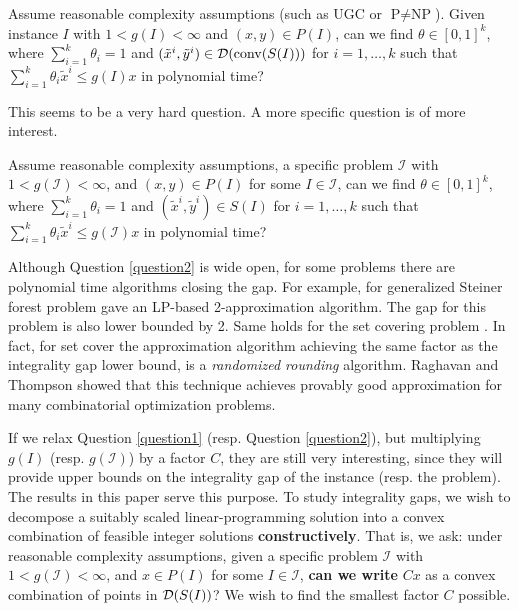 \begin{question*}\label{question1}
	Assume reasonable complexity assumptions (such as UGC or $\textrm{P}\neq \textrm{NP}$). Given instance $I$ with $1<g(I)<\infty$ and $(x,y)\in P(I)$, can we find $\theta \in [0,1]^k$, where $\sum_{i=1}^{k}\theta_i =1$ and $(\tilde{x}^i,\tilde{y}^i)\in \operatorname{\mathcal{D}}(\operatorname{conv}(S(I)))$ for $i=1,\ldots,k$ such that $\sum_{i=1}^{k}\theta_i \tilde{x}^i\leq g(I)x$ in polynomial time?
\end{question*}

This seems to be a very hard question. A more specific question is of more interest.

\begin{question}\label{question2}
	Assume reasonable complexity assumptions, a specific problem $\mathcal{I}$ with  $1<g({\mathcal{I}})<\infty$, and $(x,y)\in P(I)$ for some $I\in \mathcal{I}$, can we find $\theta \in [0,1]^k$, where $\sum_{i=1}^{k}\theta_i =1$ and $(\tilde{x}^i,\tilde{y}^i)\in S(I)$ for $i=1,\ldots,k$ such that $\sum_{i=1}^{k}\theta_i \tilde{x}^i\leq g(\mathcal{I})x$ in polynomial time?
\end{question}
Although Question \ref{question2} is wide open, for some problems there are polynomial time algorithms closing the gap. For example, for generalized Steiner forest problem \cite{jain} gave an LP-based 2-approximation algorithm. The gap for this problem is also lower bounded by 2. Same holds for the set covering problem \cite{randomizedrounding}. In fact, for set cover the approximation algorithm achieving the same factor as the integrality gap lower bound, is a \textit{randomized rounding} algorithm. Raghavan and Thompson \cite{randomizedrounding} showed that this technique achieves provably good approximation for many combinatorial optimization problems.  

If we relax Question \ref{question1} (resp. Question \ref{question2}), but multiplying $g(I)$ (resp. $g(\mathcal{I})$) by a factor $C$, they are still very interesting, since they will provide upper bounds on the integrality gap of the instance (resp. the problem). The results in this paper serve this purpose.
\fi
To study integrality gaps, we wish to decompose a suitably scaled linear-programming solution into a convex combination of feasible integer solutions {\bf constructively}.  That is, we ask: under reasonable complexity assumptions, given a specific problem $\mathcal{I}$ with  $1<g(\mathcal{I})<\infty$, and $x\in P(I)$ for some $I\in \mathcal{I}$, \textbf{can we write} $Cx$ as a convex combination of points in $\operatorname{\mathcal{D}}(S(I))$? We wish to find the smallest factor $C$ possible.


